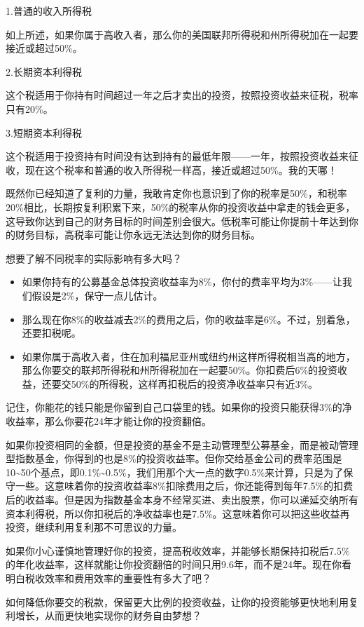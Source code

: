 1.普通的收入所得税

如上所述，如果你属于高收入者，那么你的美国联邦所得税和州所得税加在一起要接近或超过50\%。

2.长期资本利得税

这个税适用于你持有时间超过一年之后才卖出的投资，按照投资收益来征税，税率只有20\%。

3.短期资本利得税

这个税适用于投资持有时间没有达到持有的最低年限——一年，按照投资收益来征收，现在这个税率和普通的收入所得税一样高，接近或超过50\%。我的天哪！

既然你已经知道了复利的力量，我敢肯定你也意识到了你的税率是50\%，和税率20\%相比，长期按复利积累下来，50\%的税率从你的投资收益中拿走的钱会更多，这导致你达到自己的财务目标的时间差别会很大。低税率可能让你提前十年达到你的财务目标，高税率可能让你永远无法达到你的财务目标。

想要了解不同税率的实际影响有多大吗？

\begin{itemize}
\item 如果你持有的公募基金总体投资收益率为8\%，你付的费率平均为3\%——让我们假设是2\%，保守一点儿估计。
\item 那么现在你8\%的收益减去2\%的费用之后，你的收益率是6\%。不过，别着急，还要扣税呢。
\item 如果你属于高收入者，住在加利福尼亚州或纽约州这样所得税相当高的地方，那么你要交的联邦所得税和州所得税加在一起要50\%。你扣费后6\%的投资收益，还要交50\%的所得税，这样再扣税后的投资净收益率只有近3\%。
\end{itemize}

记住，你能花的钱只能是你留到自己口袋里的钱。如果你的投资只能获得3\%的净收益率，那么你要花24年才能让你的投资翻倍。

如果你投资相同的金额，但是投资的基金不是主动管理型公募基金，而是被动管理型指数基金，你得到的也是8\%的投资收益率。但你交给基金公司的费率范围是10\textasciitilde{}50个基点，即0.1\%\textasciitilde{}0.5\%，我们用那个大一点的数字0.5\%来计算，只是为了保守一些。这意味着你的投资收益率8\%扣除费用之后，你还能得到每年7.5\%的扣费后的收益率。但是因为指数基金本身不经常买进、卖出股票，你可以递延交纳所有资本利得税，所以你扣税后的净收益率也是7.5\%。这意味着你可以把这些收益再投资，继续利用复利那不可思议的力量。

如果你小心谨慎地管理好你的投资，提高税收效率，并能够长期保持扣税后7.5\%的年化收益率，这样就能让你投资翻倍的时间只用9.6年，而不是24年。现在你看明白税收效率和费用效率的重要性有多大了吧？

如何降低你要交的税款，保留更大比例的投资收益，让你的投资能够更快地利用复利增长，从而更快地实现你的财务自由梦想？

